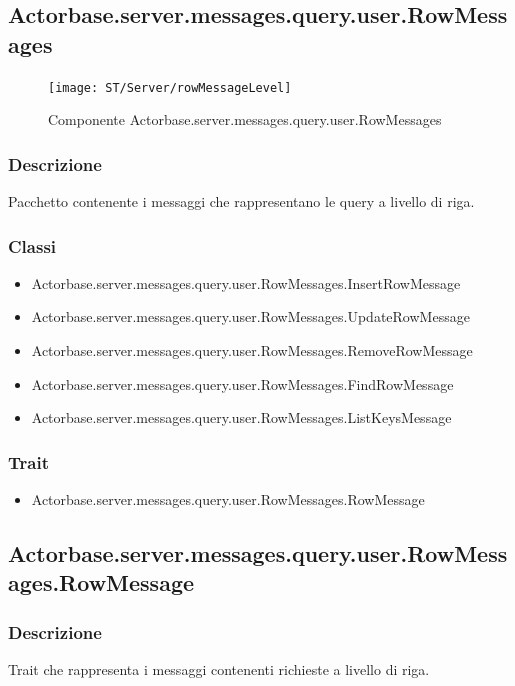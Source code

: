 \documentclass[a4paper]{article}
\begin{document}
		\subsection{Actorbase.server.messages.query.user.RowMessages}
		
			\begin{figure}[H]
				\centering
				\texttt{[image: ST/Server/rowMessageLevel]}
				\caption{Componente Actorbase.server.messages.query.user.RowMessages}
			\end{figure}
			
			\subsubsection{Descrizione}
				Pacchetto contenente i messaggi che rappresentano le query a livello di riga.
				
			\subsubsection{Classi}
				\begin{itemize}
					\item Actorbase.server.messages.query.user.RowMessages.InsertRowMessage
					\item Actorbase.server.messages.query.user.RowMessages.UpdateRowMessage
					\item Actorbase.server.messages.query.user.RowMessages.RemoveRowMessage
					\item Actorbase.server.messages.query.user.RowMessages.FindRowMessage
					\item Actorbase.server.messages.query.user.RowMessages.ListKeysMessage
				\end{itemize}
				
			\subsubsection{Trait}
				\begin{itemize}
					\item Actorbase.server.messages.query.user.RowMessages.RowMessage
				\end{itemize}
		
		\subsection{Actorbase.server.messages.query.user.RowMessages.RowMessage}
			\subsubsection{Descrizione}
				Trait che rappresenta i messaggi contenenti richieste a livello di riga.
				
\end{document}
